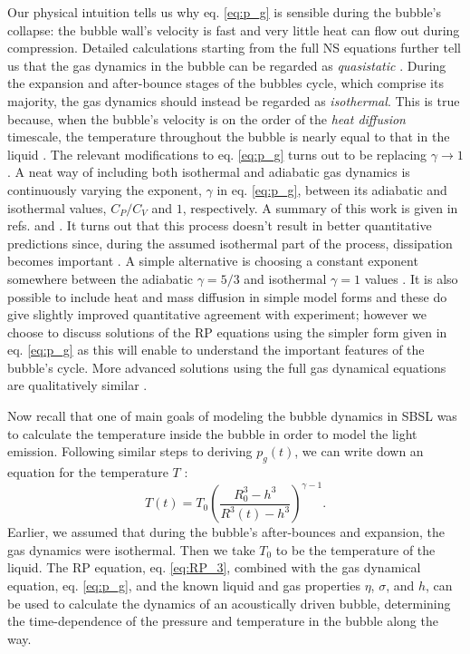 \documentclass[rmp,aps,nofootinbib,superscriptaddress,floatfix]{revtex4-2}
\begin{document}
Our physical intuition tells us why eq. \ref{eq:p_g} is sensible during the bubble's collapse: the bubble wall's velocity is fast and very little heat can flow out during compression. Detailed calculations starting from the full NS equations further tell us that the gas dynamics in the bubble can be regarded as \emph{quasistatic} \cite{}. During the expansion and after-bounce stages of the bubbles cycle, which comprise its majority, the gas dynamics should instead be regarded as \emph{isothermal}. This is true because, when the bubble's velocity is on the order of the \emph{heat diffusion} timescale, the temperature throughout the bubble is nearly equal to that in the liquid \cite{prosperetti1999old,brenner2002single,yasui2018acoustic}. The relevant modifications to eq. \ref{eq:p_g} turns out to be replacing $\gamma\rightarrow 1$. A neat way of including both isothermal and adiabatic gas dynamics is continuously varying the exponent, $\gamma$ in eq. \ref{eq:p_g}, between its adiabatic and isothermal values, $C_P/C_V$ and $1$, respectively. A summary of this work is given in refs. \cite{brenner2002single} and \cite{prosperetti1999old}. It turns out that this process doesn't result in better quantitative predictions since, during the assumed isothermal part of the process, dissipation becomes important \cite{brenner2002single}. A simple alternative is choosing a constant exponent somewhere between the adiabatic $\gamma=5/3$ and isothermal $\gamma=1$ values \cite{hilgenfeldt1999simple}. It is also possible to include heat and mass diffusion in simple model forms and these do give slightly improved quantitative agreement with experiment; however we choose to discuss solutions of the RP equations using the simpler form given in eq. \ref{eq:p_g} as this will enable to understand the important features of the bubble's cycle. More advanced solutions using the full gas dynamical equations are qualitatively similar \cite{brenner2002single,yasui2018acoustic}.

Now recall that one of main goals of modeling the bubble dynamics in SBSL was to calculate the temperature inside the bubble in order to model the light emission. Following similar steps to deriving $p_g(t)$, we can write down an equation for the temperature $T$ \cite{barber1997defining,brenner2002single}:
\begin{equation}
    T(t) = T_0 \left( \frac{R_0^3-h^3}{R^3(t)-h^3} \right)^ {\gamma-1}.
    \label{eq:T(t)}
\end{equation}
Earlier, we assumed that during the bubble's after-bounces and expansion, the gas dynamics were isothermal. Then we take $T_0$ to be the temperature of the liquid. The RP equation, eq. \ref{eq:RP_3}, combined with the gas dynamical equation, eq. \ref{eq:p_g}, and the known liquid and gas properties $\eta$, $\sigma$, and $h$, can be used to calculate the dynamics of an acoustically driven bubble, determining the time-dependence of the pressure and temperature in the bubble along the way. 
\end{document}
